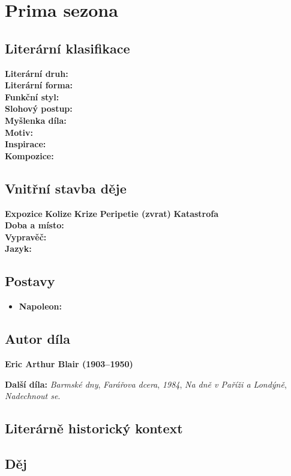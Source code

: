 \documentclass[12pt, a4paper]{article}
\newcommand{\mybf}[1]{\textcolor[RGB]{0, 179, 219}{\textbf{#1}}}
\begin{document}
\newpage

\section{Prima sezona}

\subsection*{Literární klasifikace}
\mybf{Literární druh:} \\[3pt]
\mybf{Literární forma:} \\[3pt]
\mybf{Funkční styl:} \\[3pt]
\mybf{Slohový postup:} \\[10pt]
\mybf{Myšlenka díla:} \\[10pt]
\mybf{Motiv:} \\[10pt]
\mybf{Inspirace:} \\[10pt]
\mybf{Kompozice:} 

\subsection*{Vnitřní stavba děje}
\noindent\textbf{Expozice} 
\noindent\textbf{Kolize} 
\noindent\textbf{Krize} 
\noindent\textbf{Peripetie (zvrat)} 
\noindent\textbf{Katastrofa} \\[10pt]
\mybf{Doba a místo:} \\[10pt]
\mybf{Vypravěč:} \\[10pt]
\mybf{Jazyk:} 

\subsection*{Postavy}
\begin{itemize}[itemsep=0.3em]
	\item \textbf{Napoleon:}
\end{itemize}

\subsection*{Autor díla}
\textbf{Eric Arthur Blair (1903--1950)}

\textbf{Další díla:} \textit{Barmské dny}, \textit{Farářova dcera}, \textit{1984}, \textit{Na dně v Paříži a Londýně}, \textit{Nadechnout se}.

\subsection*{Literárně historický kontext}

{\color{subsectioncolor}\hrulefill}
\subsection*{\color{subsectioncolor}Děj}

\newpage
\end{document}
